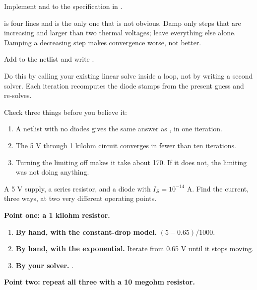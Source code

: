 \label{c4:ex:6}
Implement  and  to the specification in .

 is four lines and is the only one that is not obvious. Damp only steps that are increasing and larger than two thermal voltages; leave everything else alone. Damping a decreasing step makes convergence worse, not better.

\label{c4:ex:7}
Add  to the netlist and write .

Do this by calling your existing linear solve inside a loop, not by writing a second solver. Each iteration recomputes the diode stamps from the present guess and re-solves.

Check three things before you believe it:

\begin{enumerate}
  \item A netlist with no diodes gives the same answer as , in one iteration.
  \item The 5 V through 1 kilohm circuit converges in fewer than ten iterations.
  \item Turning the limiting off makes it take about 170. If it does not, the limiting was not doing anything.
\end{enumerate}

\label{c4:ex:8}
A 5 V supply, a series resistor, and a diode with $I_S = 10^{-14}$ A. Find the current, three ways, at two very different operating points.

\textbf{Point one: a 1 kilohm resistor.}

\begin{enumerate}
  \item \textbf{By hand, with the constant-drop model.} $(5 - 0.65)/1000$.
  \item \textbf{By hand, with the exponential.} Iterate from 0.65 V until it stops moving.
  \item \textbf{By your solver.} .
\end{enumerate}
\textbf{Point two: repeat all three with a 10 megohm resistor.}

